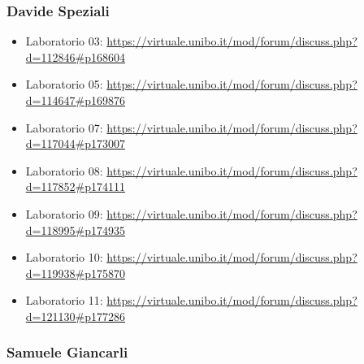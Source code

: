 \subsubsection*{Davide Speziali}
\begin{itemize}
    \item Laboratorio 03: \url{https://virtuale.unibo.it/mod/forum/discuss.php?d=112846#p168604}
    \item Laboratorio 05: \url{https://virtuale.unibo.it/mod/forum/discuss.php?d=114647#p169876}
    \item Laboratorio 07: \url{https://virtuale.unibo.it/mod/forum/discuss.php?d=117044#p173007}
    \item Laboratorio 08: \url{https://virtuale.unibo.it/mod/forum/discuss.php?d=117852#p174111}
    \item Laboratorio 09: \url{https://virtuale.unibo.it/mod/forum/discuss.php?d=118995#p174935}
    \item Laboratorio 10: \url{https://virtuale.unibo.it/mod/forum/discuss.php?d=119938#p175870}
    \item Laboratorio 11: \url{https://virtuale.unibo.it/mod/forum/discuss.php?d=121130#p177286}
\end{itemize}

\subsubsection*{Samuele Giancarli}